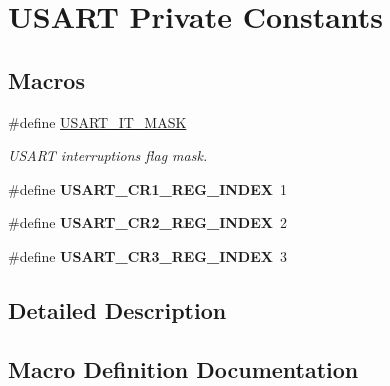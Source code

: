 \hypertarget{group___u_s_a_r_t___private___constants}{}\section{U\+S\+A\+RT Private Constants}
\label{group___u_s_a_r_t___private___constants}
\subsection*{Macros}
\begin{DoxyCompactItemize}
\item 
\#define \hyperlink{group___u_s_a_r_t___private___constants_ga034341c78baf4241878310a22ec76a06}{U\+S\+A\+R\+T\+\_\+\+I\+T\+\_\+\+M\+A\+SK}
\begin{DoxyCompactList}\small\item\em U\+S\+A\+RT interruptions flag mask. \end{DoxyCompactList}\item 
\#define {\bfseries U\+S\+A\+R\+T\+\_\+\+C\+R1\+\_\+\+R\+E\+G\+\_\+\+I\+N\+D\+EX}~1\hypertarget{group___u_s_a_r_t___private___constants_ga10d5540b51054ba0d1601160692f7298}{}\label{group___u_s_a_r_t___private___constants_ga10d5540b51054ba0d1601160692f7298}

\item 
\#define {\bfseries U\+S\+A\+R\+T\+\_\+\+C\+R2\+\_\+\+R\+E\+G\+\_\+\+I\+N\+D\+EX}~2\hypertarget{group___u_s_a_r_t___private___constants_ga2d4c62a81acf30ee11ffd4add930f828}{}\label{group___u_s_a_r_t___private___constants_ga2d4c62a81acf30ee11ffd4add930f828}

\item 
\#define {\bfseries U\+S\+A\+R\+T\+\_\+\+C\+R3\+\_\+\+R\+E\+G\+\_\+\+I\+N\+D\+EX}~3\hypertarget{group___u_s_a_r_t___private___constants_ga408bddb54adca228b1fe74d15ca39957}{}\label{group___u_s_a_r_t___private___constants_ga408bddb54adca228b1fe74d15ca39957}

\end{DoxyCompactItemize}


\subsection{Detailed Description}


\subsection{Macro Definition Documentation}
